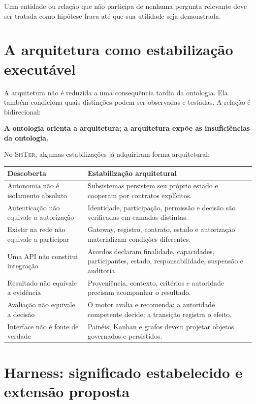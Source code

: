 \documentclass[11pt,a4paper,oneside]{article}
\newcommand{\sister}{\textsc{SisTer}}
\begin{document}
Uma entidade ou relação que não participa de nenhuma pergunta relevante deve ser tratada como hipótese fraca até que sua utilidade seja demonstrada.

\section{A arquitetura como estabilização executável}

A arquitetura não é reduzida a uma consequência tardia da ontologia. Ela também condiciona quais distinções podem ser observadas e testadas. A relação é bidirecional:

\begin{principio}[Coformação]
\centering
\textbf{A ontologia orienta a arquitetura; a arquitetura expõe as insuficiências da ontologia.}
\end{principio}

No \sister{}, algumas estabilizações já adquiriram forma arquitetural:

\begin{longtable}{P{5.0cm}P{8.4cm}}
\toprule
\textbf{Descoberta} & \textbf{Estabilização arquitetural} \\
\midrule
\endhead
Autonomia não é isolamento absoluto & Subsistemas persistem seu próprio estado e cooperam por contratos explícitos. \\
Autenticação não equivale a autorização & Identidade, participação, permissão e decisão são verificadas em camadas distintas. \\
Existir na rede não equivale a participar & Gateway, registro, contrato, estado e autorização materializam condições diferentes. \\
Uma API não constitui integração & Acordos declaram finalidade, capacidades, participantes, estado, responsabilidade, suspensão e auditoria. \\
Resultado não equivale a evidência & Proveniência, contexto, critérios e autoridade precisam acompanhar o resultado. \\
Avaliação não equivale a decisão & O motor avalia e recomenda; a autoridade competente decide; a transição registra o efeito. \\
Interface não é fonte de verdade & Painéis, Kanban e grafos devem projetar objetos governados e persistidos. \\
\bottomrule
\end{longtable}

\section{Harness: significado estabelecido e extensão proposta}
\end{document}
